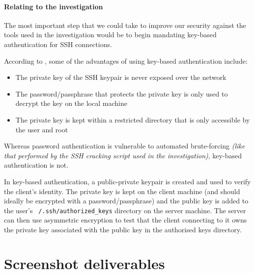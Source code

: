 \documentclass[12pt]{report}
\begin{document}
\subsubsection{Relating to the investigation}
The most important step that we could take to improve our security against the tools used in the investigation would be to begin mandating key-based authentication for SSH connections.

According to \cite{site:digitalocean:insider_threat_examples:20141020}, some of the advantages of using key-based authentication include:
\begin{itemize}
  \item The private key of the SSH keypair is never exposed over the network
  \item The password/passphrase that protects the private key is only used to decrypt the key on the local machine
  \item The private key is kept within a restricted directory that is only accessible by the user and root
\end{itemize}

Whereas password authentication is vulnerable to automated brute-forcing \textit{(like that performed by the SSH cracking script used in the investigation)}, key-based authentication is not.

In key-based authentication, a public-private keypair is created and used to verify the client's identity. The private key is kept on the client machine (and should ideally be encrypted with a password/passphrase) and the public key is added to the user's \texttt{~/.ssh/authorized\_keys} directory on the server machine. The server can then use asymmetric encryption to test that the client connecting to it owns the private key associated with the public key in the authorised keys directory.



\begin{flushleft}
  
\end{flushleft}


\appendix

\chapter{Screenshot deliverables}
\end{document}
